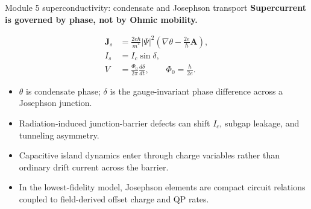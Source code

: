 \documentclass[aspectratio=169,10pt]{beamer}
\begin{document}
\begin{frame}{Module 5 superconductivity: condensate and Josephson transport}
\footnotesize
\textbf{Supercurrent is governed by phase, not by Ohmic mobility.}

\vspace{-0.15em}
\begin{align*}
\mathbf J_s
&=\frac{2e\hbar}{m^*}|\Psi|^2
\left(\nabla\theta-\frac{2e}{\hbar}\mathbf A\right),\\[-0.05em]
I_s&=I_c\sin\delta,\\[-0.05em]
V&=\frac{\Phi_0}{2\pi}\frac{d\delta}{dt},
\qquad
\Phi_0=\frac{h}{2e}.
\end{align*}

\vspace{-0.2em}
\begin{itemize}
    \item $\theta$ is condensate phase; $\delta$ is the gauge-invariant phase difference across a Josephson junction.
    \item Radiation-induced junction-barrier defects can shift $I_c$, subgap leakage, and tunneling asymmetry.
    \item Capacitive island dynamics enter through charge variables rather than ordinary drift current across the barrier.
    \item In the lowest-fidelity model, Josephson elements are compact circuit relations coupled to field-derived offset charge and QP rates.
\end{itemize}
\end{frame}
\end{document}
